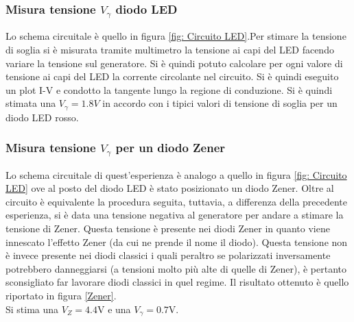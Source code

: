 \subsubsection{Misura tensione $V_{\gamma}$ diodo LED}
Lo schema circuitale è quello in figura \ref{fig: Circuito LED}.Per stimare la tensione di soglia si è misurata tramite multimetro la tensione ai capi del LED facendo variare la tensione sul generatore. Si è quindi potuto calcolare per ogni valore di tensione ai capi del LED la corrente circolante nel circuito. Si è quindi eseguito un plot I-V e condotto la tangente lungo la regione di conduzione. Si è quindi stimata una $V_{\gamma}=1.8\unit{V}$ in accordo con i tipici valori di tensione di soglia per un diodo LED rosso.

\subsubsection{Misura tensione $V_\gamma$ per un diodo Zener}
Lo schema circuitale di quest'esperienza è analogo a quello in figura \ref{fig: Circuito LED} ove al posto del diodo LED è stato posizionato un diodo Zener. Oltre al circuito è equivalente la procedura seguita, tuttavia, a differenza della precedente esperienza, si è data una tensione negativa al generatore per andare a stimare la tensione di Zener. Questa tensione è presente nei diodi Zener in quanto viene innescato l'effetto Zener (da cui ne prende il nome il diodo). Questa tensione non è invece presente nei diodi classici i quali peraltro se polarizzati inversamente potrebbero danneggiarsi (a tensioni molto più alte di quelle di Zener), è pertanto sconsigliato far lavorare diodi classici in quel regime. Il risultato ottenuto è quello riportato in figura \ref{Zener}.\\
Si stima una $V_Z=4.4\unit{\V}$ e una $V_{\gamma}=0.7\unit{\V}$.

